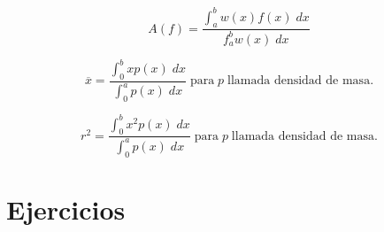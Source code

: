\begin{tcolorbox}
    \begin{def.}
	$$A(f) = \dfrac{\int_a^b w(x)f(x)\; dx}{f_a^b w(x)\; dx}$$
    \end{def.}
\end{tcolorbox}

\begin{tcolorbox}
    \begin{def.}
	$$\overline{x}=\dfrac{\int_0^b xp(x)\; dx}{\int_0^a p(x)\; dx} \; \mbox{para}\; p \; \mbox{llamada densidad de masa}.$$
    \end{def.}
\end{tcolorbox}

\begin{tcolorbox}
    \begin{def.}
	$$r^2=\dfrac{\int_0^b x^2p(x)\; dx}{\int_0^a p(x)\; dx} \; \mbox{para}\; p \; \mbox{llamada densidad de masa}.$$
    \end{def.}
\end{tcolorbox}


\section{Ejercicios}

